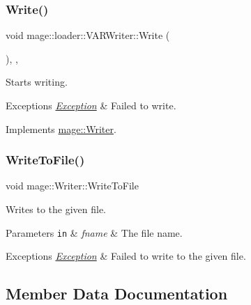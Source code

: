 \subsubsection{\texorpdfstring{Write()}{Write()}}
{\footnotesize\ttfamily void mage\+::loader\+::\+V\+A\+R\+Writer\+::\+Write (\begin{DoxyParamCaption}{ }\end{DoxyParamCaption})\hspace{0.3cm}{\ttfamily [override]}, {\ttfamily [private]}, {\ttfamily [virtual]}}

Starts writing.


\begin{DoxyExceptions}{Exceptions}
{\em \mbox{\hyperlink{classmage_1_1_exception}{Exception}}} & Failed to write. \\
\hline
\end{DoxyExceptions}


Implements \mbox{\hyperlink{classmage_1_1_writer_a9baf695ef7f6180bef883f60bcb3ac07}{mage\+::\+Writer}}.

\mbox{\label{classmage_1_1loader_1_1_v_a_r_writer_a9af5416468b0a51983d07aec8061eb27}} 
\subsubsection{\texorpdfstring{Write\+To\+File()}{WriteToFile()}}
{\footnotesize\ttfamily void mage\+::\+Writer\+::\+Write\+To\+File}

Writes to the given file.


\begin{DoxyParams}[1]{Parameters}
\mbox{\tt in}  & {\em fname} & The file name. \\
\hline
\end{DoxyParams}

\begin{DoxyExceptions}{Exceptions}
{\em \mbox{\hyperlink{classmage_1_1_exception}{Exception}}} & Failed to write to the given file. \\
\hline
\end{DoxyExceptions}


\subsection{Member Data Documentation}
\mbox{\label{classmage_1_1loader_1_1_v_a_r_writer_a405d288ded715f12f6f3c8cf29beb6a6}} 
